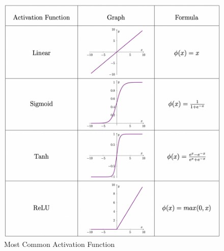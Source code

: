 \begin{figure}[!ht]
    \centering
    \includegraphics[width=5in]{figures/acti_func_table.png}
    \caption{Most Common Activation Function}
    \label{acti_func_table}
\end{figure}

